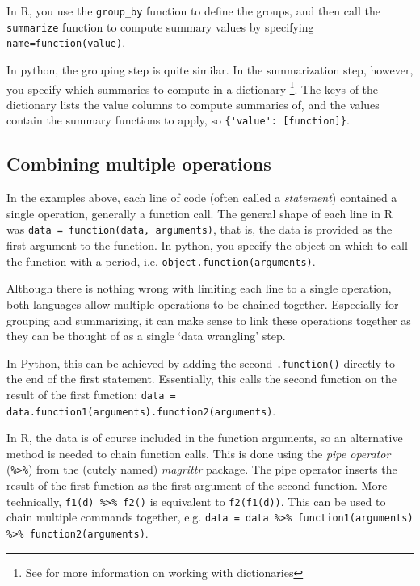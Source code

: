 
In R, you use the \verb+group_by+ function to define the groups,
and then call the \verb+summarize+ function to compute summary values by specifying
\verb+name=function(value)+.

In python, the grouping step is quite similar.
In the summarization step, however, you specify which summaries to compute in a dictionary%
\footnote{See  for more information on working with dictionaries}.
The keys of the dictionary lists the value columns to compute summaries of,
and the values contain the summary functions to apply, so \verb+{'value': [function]}+.

\subsection{Combining multiple operations}

In the examples above, each line of code (often called a \emph{statement}) contained a single operation, generally a function call.
The general shape of each line in R was \verb+data = function(data, arguments)+, that is, the data is provided as the first argument to the function.
In python, you specify the object on which to call the function with a period,
i.e. \verb+object.function(arguments)+.

Although there is nothing wrong with limiting each line to a single operation, both languages allow multiple operations to be chained together.
Especially for grouping and summarizing, it can make sense to link these operations together as they can be thought of as a single `data wrangling' step.

In Python, this can be achieved by adding the second \verb+.function()+ directly to the end of the first statement.
Essentially, this calls the second function on the result of the first function: \verb+data = data.function1(arguments).function2(arguments)+.

In R, the data is of course included in the function arguments, so an alternative method is needed to chain function calls.
This is done using the \emph{pipe operator} (\verb+%>%+) from the (cutely named) \emph{magrittr} package.
The pipe operator inserts the result of the first function as the first argument of the second function.
More technically, \verb+f1(d) %>% f2()+ is equivalent to \verb+f2(f1(d))+.
This can be used to chain multiple commands together, e.g. \verb+data = data %>% function1(arguments) %>% function2(arguments)+.

